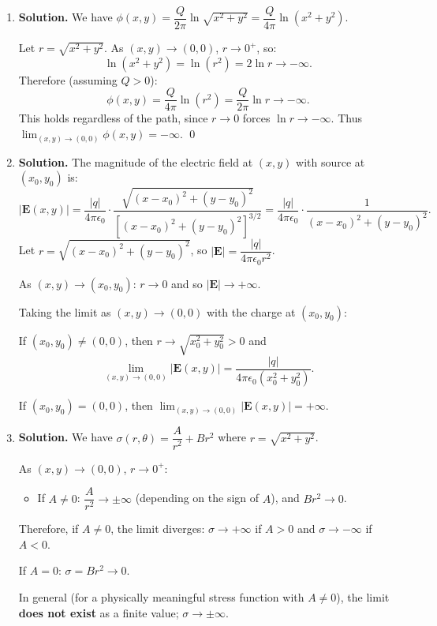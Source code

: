 \begin{enumerate}
\item \textbf{Solution.}
We have $\phi(x,y) = \dfrac{Q}{2\pi}\ln\sqrt{x^2+y^2} = \dfrac{Q}{4\pi}\ln(x^2+y^2)$.

Let $r = \sqrt{x^2 + y^2}$. As $(x,y) \to (0,0)$, $r \to 0^+$, so:
\[
\ln(x^2 + y^2) = \ln(r^2) = 2\ln r \to -\infty.
\]
Therefore (assuming $Q > 0$):
\[
\phi(x,y) = \frac{Q}{4\pi}\ln(r^2) = \frac{Q}{2\pi}\ln r \to -\infty.
\]
This holds regardless of the path, since $r \to 0$ forces $\ln r \to -\infty$. Thus $\displaystyle\lim_{(x,y)\to(0,0)} \phi(x,y) = -\infty$. \qed

\item \textbf{Solution.}
The magnitude of the electric field at $(x,y)$ with source at $(x_0, y_0)$ is:
\[
|\mathbf{E}(x,y)| = \frac{|q|}{4\pi\epsilon_0} \cdot \frac{\sqrt{(x-x_0)^2 + (y-y_0)^2}}{[(x-x_0)^2+(y-y_0)^2]^{3/2}} = \frac{|q|}{4\pi\epsilon_0} \cdot \frac{1}{(x-x_0)^2+(y-y_0)^2}.
\]
Let $r = \sqrt{(x-x_0)^2+(y-y_0)^2}$, so $|\mathbf{E}| = \dfrac{|q|}{4\pi\epsilon_0 r^2}$.

As $(x,y) \to (x_0, y_0)$: $r \to 0$ and so $|\mathbf{E}| \to +\infty$.

Taking the limit as $(x,y) \to (0,0)$ with the charge at $(x_0, y_0)$:

If $(x_0, y_0) \neq (0,0)$, then $r \to \sqrt{x_0^2 + y_0^2} > 0$ and
\[
\lim_{(x,y)\to(0,0)} |\mathbf{E}(x,y)| = \frac{|q|}{4\pi\epsilon_0(x_0^2+y_0^2)}.
\]

If $(x_0, y_0) = (0,0)$, then $\displaystyle\lim_{(x,y)\to(0,0)} |\mathbf{E}(x,y)| = +\infty$.

\item \textbf{Solution.}
We have $\sigma(r,\theta) = \dfrac{A}{r^2} + Br^2$ where $r = \sqrt{x^2+y^2}$.

As $(x,y) \to (0,0)$, $r \to 0^+$:
\begin{itemize}
    \item If $A \neq 0$: $\dfrac{A}{r^2} \to \pm\infty$ (depending on the sign of $A$), and $Br^2 \to 0$.
\end{itemize}
Therefore, if $A \neq 0$, the limit diverges: $\sigma \to +\infty$ if $A > 0$ and $\sigma \to -\infty$ if $A < 0$.

If $A = 0$: $\sigma = Br^2 \to 0$.

In general (for a physically meaningful stress function with $A \neq 0$), the limit \textbf{does not exist} as a finite value; $\sigma \to \pm\infty$.



\end{enumerate}
